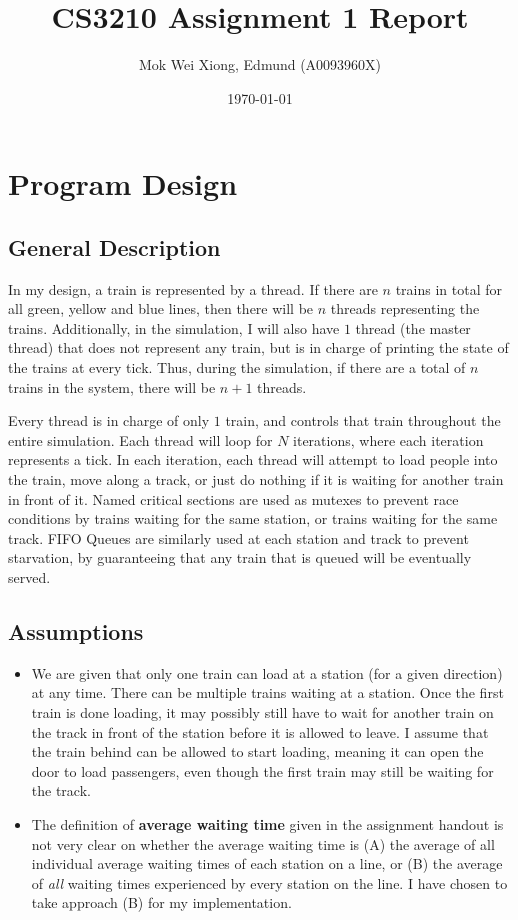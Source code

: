 \documentclass[12pt]{article}
\title{CS3210 Assignment 1 Report}
\date{\today}
\author{Mok Wei Xiong, Edmund (A0093960X)}
\begin{document}
\maketitle

\section{Program Design}

\subsection{General Description}
In my design, a train is represented by a thread. If there are $n$ trains in total for all green, yellow and blue lines, then there will be $n$ threads representing the trains. Additionally, in the simulation, I will also have $1$ thread (the master thread) that does not represent any train, but is in charge of printing the state of the trains at every tick. Thus, during the simulation, if there are a total of $n$ trains in the system, there will be $n+1$ threads.

\bigbreak \noindent Every thread is in charge of only $1$ train, and controls that train throughout the entire simulation. Each thread will loop for $N$ iterations, where each iteration represents a tick. In each iteration, each thread will attempt to load people into the train, move along a track, or just do nothing if it is waiting for another train in front of it. Named critical sections are used as mutexes to prevent race conditions by trains waiting for the same station, or trains waiting for the same track. FIFO Queues are similarly used at each station and track to prevent starvation, by guaranteeing that any train that is queued will be eventually served.

\subsection{Assumptions}
\begin{itemize}
	\item We are given that only one train can load at a station (for a given direction) at any time. There can be multiple trains waiting at a station. Once the first train is done loading, it may possibly still have to wait for another train on the track in front of the station before it is allowed to leave. I assume that the train behind can be allowed to start loading, meaning it can open the door to load passengers, even though the first train may still be waiting for the track.
	\item The definition of \textbf{average waiting time} given in the assignment handout is not very clear on whether the average waiting time is (A) the average of all individual average waiting times of each station on a line, or (B) the average of \textit{all} waiting times experienced by every station on the line. I have chosen to take approach (B) for my implementation.
\end{itemize}
\end{document}
